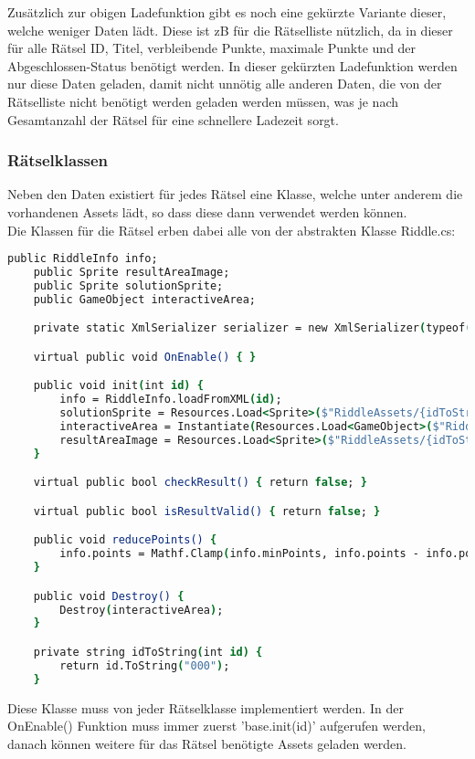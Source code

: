 Zusätzlich zur obigen Ladefunktion gibt es noch eine gekürzte Variante dieser, welche weniger Daten lädt. Diese ist zB für die Rätselliste nützlich, da in dieser für alle Rätsel ID, Titel, verbleibende Punkte, maximale Punkte und der Abgeschlossen-Status benötigt werden. In dieser gekürzten Ladefunktion werden nur diese Daten geladen, damit nicht unnötig alle anderen Daten, die von der Rätselliste nicht benötigt werden geladen werden müssen, was je nach Gesamtanzahl der Rätsel für eine schnellere Ladezeit sorgt.

\subsubsection{Rätselklassen}
Neben den Daten existiert für jedes Rätsel eine Klasse, welche unter anderem die vorhandenen Assets lädt, so dass diese dann verwendet werden können.\\
Die Klassen für die Rätsel erben dabei alle von der abstrakten Klasse Riddle.cs:
\begin{lstlisting}[language=csh, caption={Riddle.cs base Klasse}]
	public RiddleInfo info;
    public Sprite resultAreaImage;
    public Sprite solutionSprite;
    public GameObject interactiveArea;

    private static XmlSerializer serializer = new XmlSerializer(typeof(RiddleInfo));

    virtual public void OnEnable() { }

    public void init(int id) {
        info = RiddleInfo.loadFromXML(id);
        solutionSprite = Resources.Load<Sprite>($"RiddleAssets/{idToString(id)}/solution") as Sprite;
        interactiveArea = Instantiate(Resources.Load<GameObject>($"RiddleAssets/{idToString(id)}/R{idToString(id)}")) as GameObject;
        resultAreaImage = Resources.Load<Sprite>($"RiddleAssets/{idToString(id)}/result") as Sprite;
    }

    virtual public bool checkResult() { return false; }

    virtual public bool isResultValid() { return false; }

    public void reducePoints() {
        info.points = Mathf.Clamp(info.minPoints, info.points - info.pointReduction, info.maxPoints);
    }

    public void Destroy() {
        Destroy(interactiveArea);
    }

    private string idToString(int id) {
        return id.ToString("000");
    }
\end{lstlisting}
Diese Klasse muss von jeder Rätselklasse implementiert werden. In der OnEnable() Funktion muss immer zuerst 'base.init(id)' aufgerufen werden, danach können weitere für das Rätsel benötigte Assets geladen werden.\\
